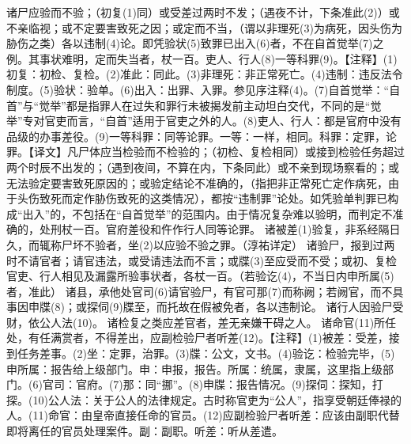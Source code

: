 \documentclass[12pt,UTF8]{ctexbook}
\begin{document}
诸尸应验而不验；（初复(1)同）或受差过两时不发；（遇夜不计，下条准此(2)）或不亲临视；或不定要害致死之因；或定而不当，（谓以非理死(3)为病死，因头伤为胁伤之类）各以违制(4)论。即凭验状(5)致罪已出入(6)者，不在自首觉举(7)之例。其事状难明，定而失当者，杖一百。吏人、行人(8)一等科罪(9)。【注释】(1)初复：初检、复检。(2)准此：同此。(3)非理死：非正常死亡。(4)违制：违反法令制度。(5)验状：验单。(6)出入：出罪、入罪。参见序注释(4)。(7)自首觉举：“自首”与“觉举”都是指罪人在过失和罪行未被揭发前主动坦白交代，不同的是“觉举”专对官吏而言，“自首”适用于官吏之外的人。(8)吏人、行人：都是官府中没有品级的办事差役。(9)一等科罪：同等论罪。一等：一样，相同。科罪：定罪，论罪。【译文】凡尸体应当检验而不检验的；（初检、复检相同）或接到检验任务超过两个时辰不出发的；（遇到夜间，不算在内，下条同此）或不亲到现场察看的；或无法验定要害致死原因的；或验定结论不准确的，（指把非正常死亡定作病死，由于头伤致死而定作胁伤致死的这类情况），都按“违制罪”论处。如凭验单判罪已构成“出入”的，不包括在“自首觉举”的范围内。由于情况复杂难以验明，而判定不准确的，处刑杖一百。官府差役和仵作行人同等论罪。
诸被差(1)验复，非系经隔日久，而辄称尸坏不验者，坐(2)以应验不验之罪。（淳祐详定）
诸验尸，报到过两时不请官者；请官违法，或受请违法而不言；或牒(3)至应受而不受；或初、复检官吏、行人相见及漏露所验事状者，各杖一百。（若验讫(4)，不当日内申所属(5)者，准此）
诸县，承他处官司(6)请官验尸，有官可那(7)而称阙；若阙官，而不具事因申牒(8)；或探伺(9)牒至，而托故在假被免者，各以违制论。
诸行人因验尸受财，依公人法(10)。
诸检复之类应差官者，差无亲嫌干碍之人。
诸命官(11)所任处，有任满赏者，不得差出，应副检验尸者听差(12)。【注释】(1)被差：受差，接到任务差事。(2)坐：定罪，治罪。(3)牒：公文，文书。(4)验讫：检验完毕，(5)申所属：报告给上级部门。申：申报，报告。所属：统属，隶属，这里指上级部门。(6)官司：官府。(7)那：同“挪”。(8)申牒：报告情况。(9)探伺：探知，打探。(10)公人法：关于公人的法律规定。古时称官吏为“公人”，指享受朝廷俸禄的人。(11)命官：由皇帝直接任命的官员。(12)应副检验尸者听差：应该由副职代替即将离任的官员处理案件。副：副职。听差：听从差遣。
\end{document}
